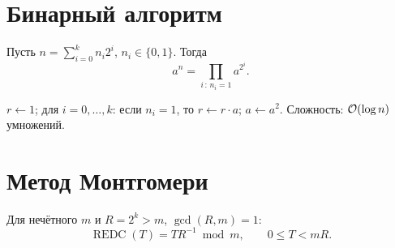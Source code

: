 \documentclass{ca-handout}
\begin{document}
\makehandouttitle

\section{Бинарный алгоритм}
Пусть $n = \sum_{i=0}^{k} n_i 2^i$, $n_i \in \{0, 1\}$. Тогда
\[
  a^n = \prod_{i\,:\,n_i = 1} a^{2^i}.
\]

\begin{reminder}[title={Алгоритм «справа налево»}]
  $r \gets 1$; для $i = 0, \dots, k$: если $n_i = 1$, то $r \gets r \cdot a$; $a \gets a^2$.
  Сложность: $\mathcal{O}(\log n)$ умножений.
\end{reminder}

\section{Метод Монтгомери}
Для нечётного $m$ и $R = 2^k > m$, $\gcd(R, m) = 1$:
\[
  \operatorname{REDC}(T) = T R^{-1} \bmod m, \qquad 0 \le T < mR.
\]

\end{document}
